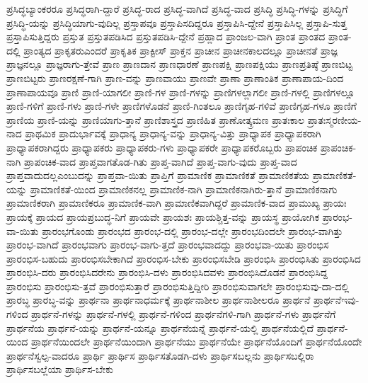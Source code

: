 {ಪ್ರಸಿದ್ಧಬ್ಯಾಂಕರರೂ
ಪ್ರಸಿದ್ಧರಾಗಿ-ದ್ದಾರೆ
ಪ್ರಸಿದ್ಧ-ರಾದ
ಪ್ರಸಿದ್ಧ-ವಾಗಿದೆ
ಪ್ರಸಿದ್ಧ-ವಾದ
ಪ್ರಸಿದ್ಧಿ
ಪ್ರಸಿದ್ಧಿ-ಗಳನ್ನು
ಪ್ರಸಿದ್ಧಿಗೆ
ಪ್ರಸಿದ್ಧಿ-ಯನ್ನು
ಪ್ರಸಿದ್ಧಿಯಾಗು-ವುದಿಲ್ಲ
ಪ್ರಸ್ತಾಪವೂ
ಪ್ರಸ್ತಾಪಿಸದಿದ್ದರೂ
ಪ್ರಸ್ತಾಪಿಸಿ-ದ್ದೇನೆ
ಪ್ರಸ್ತಾಪಿಸಿಲ್ಲ
ಪ್ರಸ್ತಾಪಿ-ಸುತ್ತ
ಪ್ರಸ್ತಾಪಿಸುತ್ತಿದ್ದರು
ಪ್ರಸ್ತುತ
ಪ್ರಸ್ತುತಪಡಿಸಿದ
ಪ್ರಸ್ತುತಪಡಿಸಿ-ದ್ದೇನೆ
ಪ್ರಹ್ಲಾದ
ಪ್ರಾಂಜಲ-ವಾಗಿ
ಪ್ರಾಂತ
ಪ್ರಾಂತದ
ಪ್ರಾಂತ-ದಲ್ಲಿ
ಪ್ರಾಂತ್ಯದ
ಪ್ರಾಕೃತರುಎಂದರೆ
ಪ್ರಾಕೃತಿಕ
ಪ್ರಾಕ್ಟೀಸ್
ಪ್ರಾಕ್ತನ
ಪ್ರಾಚೀನ
ಪ್ರಾಚೀನಕಾಲದಲ್ಲೂ
ಪ್ರಾಚೀನತೆ
ಪ್ರಾಜ್ಞ
ಪ್ರಾಜ್ಞನಲ್ಲೂ
ಪ್ರಾಜ್ಞರಾಗು-ತ್ತೇವೆ
ಪ್ರಾಣ
ಪ್ರಾಣದಾನ
ಪ್ರಾಣಧಾರಣೆ
ಪ್ರಾಣಪಕ್ಷಿ
ಪ್ರಾಣಪಕ್ಷಿಯು
ಪ್ರಾಣಪ್ರತಿಷ್ಠೆ
ಪ್ರಾಣಬಿಟ್ಟ
ಪ್ರಾಣಬಿಟ್ಟರು
ಪ್ರಾಣರಕ್ಷಣೆ-ಗಾಗಿ
ಪ್ರಾಣ-ವನ್ನು
ಪ್ರಾಣವಾಯು
ಪ್ರಾಣವೇ
ಪ್ರಾಣಾ
ಪ್ರಾಣಾಂತಿಕ
ಪ್ರಾಣಾಪಾಯ-ದಿಂದ
ಪ್ರಾಣಾಪಾಯವೂ
ಪ್ರಾಣಿ
ಪ್ರಾಣಿ-ಯಾಗಲೀ
ಪ್ರಾಣಿ-ಗಳ
ಪ್ರಾಣಿ-ಗಳನ್ನು
ಪ್ರಾಣಿಗಳಲ್ಲಾಗಲೀ
ಪ್ರಾಣಿ-ಗಳಲ್ಲಿ
ಪ್ರಾಣಿಗಳಲ್ಲೂ
ಪ್ರಾಣಿ-ಗಳಿಗೆ
ಪ್ರಾಣಿ-ಗಳು
ಪ್ರಾಣಿ-ಗಳೇ
ಪ್ರಾಣಿಗಳೊಡನೆ
ಪ್ರಾಣಿ-ಗಿಂತಲೂ
ಪ್ರಾಣಿಗೃಹ-ಗಳಿವೆ
ಪ್ರಾಣಿಗೃಹ-ಗಳೂ
ಪ್ರಾಣಿಗೆ
ಪ್ರಾಣಿಯ
ಪ್ರಾಣಿ-ಯನ್ನು
ಪ್ರಾಣಿಯಾಗು-ತ್ತಾನೆ
ಪ್ರಾಣಿಶಾಸ್ತ್ರದ
ಪ್ರಾಣಿಹಿತ
ಪ್ರಾಣೋತ್ಕ್ರಮಣ
ಪ್ರಾತಃಕಾಲ
ಪ್ರಾತಃಸ್ಮರಣೀಯ-ನಾದ
ಪ್ರಾಥಮಿಕ
ಪ್ರಾದುರ್ಭಾವಕ್ಕೆ
ಪ್ರಾಧಾನ್ಯ
ಪ್ರಾಧಾನ್ಯ-ವನ್ನು
ಪ್ರಾಧಾನ್ಯ-ವಿತ್ತು
ಪ್ರಾಧ್ಯಾಪಕ
ಪ್ರಾಧ್ಯಾಪಕರಾಗಿ
ಪ್ರಾಧ್ಯಾಪಕರಾಗಿದ್ದರು
ಪ್ರಾಧ್ಯಾಪಕರು
ಪ್ರಾಧ್ಯಾಪಕರು-ಗಳು
ಪ್ರಾಧ್ಯಾಪಕರೇ
ಪ್ರಾಧ್ಯಾಪಕರೊಬ್ಬರು
ಪ್ರಾಪಂಚಿಕ
ಪ್ರಾಪಂಚಿಕ-ನಾಗಿ
ಪ್ರಾಪಂಚಿಕ-ವಾದ
ಪ್ರಾಪ್ತವಾಗತೊಡ-ಗಿತು
ಪ್ರಾಪ್ತ-ವಾಗಿದೆ
ಪ್ರಾಪ್ತ-ವಾಗು-ವುದು
ಪ್ರಾಪ್ತ-ವಾದ
ಪ್ರಾಪ್ತವಾದುದಲ್ಲಎಂಬುದನ್ನು
ಪ್ರಾಪ್ತವಾ-ಯಿತು
ಪ್ರಾಪ್ತಿಗೆ
ಪ್ರಾಮಾಣಿಕ
ಪ್ರಾಮಾಣಿಕತೆ
ಪ್ರಾಮಾಣಿಕತೆಯ
ಪ್ರಾಮಾಣಿಕತೆ-ಯನ್ನು
ಪ್ರಾಮಾಣಿಕತೆ-ಯಿಂದ
ಪ್ರಾಮಾಣಿಕನಲ್ಲ
ಪ್ರಾಮಾಣಿಕ-ನಾಗಿ
ಪ್ರಾಮಾಣಿಕನಾಗಿರು-ತ್ತಾನೆ
ಪ್ರಾಮಾಣಿಕನಾಗು
ಪ್ರಾಮಾಣಿಕರಾಗಿ
ಪ್ರಾಮಾಣಿಕರೂ
ಪ್ರಾಮಾಣಿಕ-ವಾಗಿ
ಪ್ರಾಮಾಣಿಕವಾಗಿದ್ದರೆ
ಪ್ರಾಮಾಣಿಕ-ವಾದ
ಪ್ರಾಮುಖ್ಯ
ಪ್ರಾಯಃ
ಪ್ರಾಯಕ್ಕೆ
ಪ್ರಾಯದ
ಪ್ರಾಯಪ್ರಬುದ್ಧ-ನಿಗೆ
ಪ್ರಾಯವೇ
ಪ್ರಾಯಶಃ
ಪ್ರಾಯಶ್ಚಿತ್ತ-ವನ್ನು
ಪ್ರಾಯಸ್ಥ
ಪ್ರಾಯೋಗಿಕ
ಪ್ರಾರಂಭ-ವಾ-ಯಿತು
ಪ್ರಾರಂಭಗೊಂಡು
ಪ್ರಾರಂಭದ
ಪ್ರಾರಂಭ-ದಲ್ಲಿ
ಪ್ರಾರಂಭ-ದಲ್ಲೇ
ಪ್ರಾರಂಭದಿಂದಲೇ
ಪ್ರಾರಂಭ-ವಾಗಿತ್ತು
ಪ್ರಾರಂಭ-ವಾಗಿದೆ
ಪ್ರಾರಂಭವಾಗು
ಪ್ರಾರಂಭ-ವಾಗು-ತ್ತದೆ
ಪ್ರಾರಂಭವಾದದ್ದು
ಪ್ರಾರಂಭವಾ-ಯಿತು
ಪ್ರಾರಂಭಿಸ
ಪ್ರಾರಂಭಿಸ-ಬಹುದು
ಪ್ರಾರಂಭಿಸಬೇಕಾಗಿದೆ
ಪ್ರಾರಂಭಿಸ-ಬೇಕು
ಪ್ರಾರಂಭಿಸಬೇಡಿ
ಪ್ರಾರಂಭಿಸಿ
ಪ್ರಾರಂಭಿಸಿತು
ಪ್ರಾರಂಭಿಸಿದ
ಪ್ರಾರಂಭಿಸಿ-ದರು
ಪ್ರಾರಂಭಿಸಿದರೇನು
ಪ್ರಾರಂಭಿಸಿ-ದಳು
ಪ್ರಾರಂಭಿಸಿದವಳು
ಪ್ರಾರಂಭಿಸಿದೊಡನೆ
ಪ್ರಾರಂಭಿಸಿದ್ದ
ಪ್ರಾರಂಭಿಸು
ಪ್ರಾರಂಭಿಸು-ತ್ತವೆ
ಪ್ರಾರಂಭಿಸುತ್ತಾರೆ
ಪ್ರಾರಂಭಿಸುತ್ತಿದ್ದೀರಿ
ಪ್ರಾರಂಭಿಸುವಾಗಲೇ
ಪ್ರಾರಂಭಿಸುವು-ದಾ-ದಲ್ಲಿ
ಪ್ರಾರಬ್ಧ
ಪ್ರಾರಬ್ಧ-ವನ್ನು
ಪ್ರಾರ್ಥನಾ
ಪ್ರಾರ್ಥನಾಧರ್ಮಕ್ಕೆ
ಪ್ರಾರ್ಥನಾಶೀಲ
ಪ್ರಾರ್ಥನಾಶೀಲರೂ
ಪ್ರಾರ್ಥನೆ
ಪ್ರಾರ್ಥನೆಇವು-ಗಳಿಂದ
ಪ್ರಾರ್ಥನೆ-ಗಳನ್ನು
ಪ್ರಾರ್ಥನೆ-ಗಳಲ್ಲಿ
ಪ್ರಾರ್ಥನೆ-ಗಳಿಂದ
ಪ್ರಾರ್ಥನೆಗಳಿ-ಗಾಗಿ
ಪ್ರಾರ್ಥನೆ-ಗಳು
ಪ್ರಾರ್ಥನೆಗೆ
ಪ್ರಾರ್ಥನೆಯ
ಪ್ರಾರ್ಥನೆ-ಯನ್ನು
ಪ್ರಾರ್ಥನೆ-ಯನ್ನೂ
ಪ್ರಾರ್ಥನೆಯನ್ನೆ
ಪ್ರಾರ್ಥನೆ-ಯಲ್ಲಿ
ಪ್ರಾರ್ಥನೆಯಲ್ಲಿದೆ
ಪ್ರಾರ್ಥನೆ-ಯಿಂದ
ಪ್ರಾರ್ಥನೆಯಿಂದಲೇ
ಪ್ರಾರ್ಥನೆಯಿಂದಾಗಿ
ಪ್ರಾರ್ಥನೆಯು
ಪ್ರಾರ್ಥನೆಯೇ
ಪ್ರಾರ್ಥನೆಯೊಂದಿಗೆ
ಪ್ರಾರ್ಥನೆಯೊಂದೇ
ಪ್ರಾರ್ಥನೆಸ್ವಲ್ಪ-ವಾದರೂ
ಪ್ರಾರ್ಥಿ
ಪ್ರಾರ್ಥಿಸ
ಪ್ರಾರ್ಥಿಸತೊಡಗಿ-ದಳು
ಪ್ರಾರ್ಥಿಸಬಲ್ಲನು
ಪ್ರಾರ್ಥಿಸಬಲ್ಲಿರಾ
ಪ್ರಾರ್ಥಿಸಬಲ್ಲೆಯಾ
ಪ್ರಾರ್ಥಿಸ-ಬೇಕು
}
